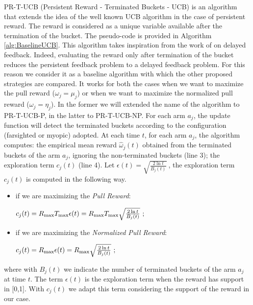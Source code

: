PR-T-UCB (Persistent Reward - Terminated Buckets - UCB) is an algorithm that extends the idea of the well known UCB algorithm in the case of persistent reward. The reward is considered as a unique variable available after the termination of the bucket. The pseudo-code is provided in Algorithm \ref{alg:BaselineUCB}.
This algorithm takes inspiration from the work of \cite{joulani2013} on delayed feedback. Indeed, evaluating the reward only after termination of the bucket reduces the persistent feedback problem to a delayed feedback problem. For this reason we consider it as a baseline algorithm with which the other proposed strategies are compared. It works for both the cases when we want to maximize the pull reward ($\omega_j = \mu_j$) or when we want to maximize the normalized pull reward ($\omega_j = \eta_j$). In the former we will extended the name of the algorithm to PR-T-UCB-P, in the latter to PR-T-UCB-NP.
For each arm $a_j$, the update function will detect the terminated buckets according to the configuration (farsighted or myopic) adopted. At each time $t$, for each arm $a_j$, the algorithm computes: the empirical mean reward $\hat{\omega}_j(t)$ obtained from the terminated buckets of the arm $a_j$, ignoring the non-terminated buckets (line 3); the exploration term $c_j(t)$ (line 4). Let $\epsilon(t) = \sqrt{\frac{2\ln t}{B_j(t)}} \ $, the exploration term  $c_j(t)$ is computed in the following way.
\begin{itemize}
	\item if we are maximizing the \emph{Pull Reward}:\\
	\begin{centering}
		$c_j(t) = R_{\textnormal{max}}  T_{\textnormal{max}} \epsilon(t) = R_{\textnormal{max}}  T_{\textnormal{max}} \sqrt{\frac{2\ln t}{B_j(t)}} \ ;$	
	\end{centering}
		 
	\item if we are maximizing the \emph{Normalized Pull Reward}:\\
	\begin{centering}
			$c_j(t) =R_{\textnormal{max}}  \epsilon(t) = R_{\textnormal{max}}  \sqrt{\frac{2\ln t}{B_j(t)}} \ ;$
	\end{centering}	
\end{itemize}


 where with ${B_j(t)}$ we indicate the number of terminated buckets of the arm $a_j$ at time $t$. The term $\epsilon(t)$ is the exploration term when the reward has support in [0,1]. With $c_j(t)$ we adapt this term considering the support of the reward in our case.
 
